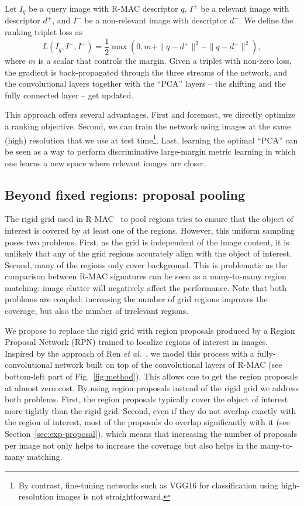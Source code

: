 \documentclass[runningheads]{llncs}
\def\etal{\emph{et al.}~}
\begin{document}
Let $I_q$ be a query image with R-MAC descriptor $q$, $I^+$ be a relevant image with descriptor $d^+$, and $I^-$ be a
non-relevant image with descriptor $d^-$.
We define the ranking triplet loss as
\begin{equation}
L(I_q,I^+,I^-) = \frac{1}{2} \max (0, m + \|q-d^+\|^2 - \|q-d^-\|^2),
\end{equation}
where $m$ is a scalar that controls the margin. 
Given a triplet with non-zero loss, the gradient is back-propagated through the three streams of the
network, and the convolutional layers together with the ``PCA'' layers -- the shifting and the fully connected layer -- get updated.

This approach offers several advantages. First and foremost, we directly optimize a ranking objective. Second, we can
train the network using images at the same (high) resolution that we use at test time\footnote{By contrast, fine-tuning
networks such as VGG16 for classification using high-resolution images is not straightforward.}. Last, learning the
optimal ``PCA'' can be seen as a way to perform discriminative large-margin metric learning \cite{Weinberger:2009} in
which one learns a new space where relevant images are closer.

\subsection{Beyond fixed regions: proposal pooling}
\label{sec:proposal}
The rigid grid used in R-MAC~\cite{Tolias2016} to pool regions tries to ensure that the object of interest is covered by at least one of the regions.
However, this uniform sampling poses two problems. First, as the grid is independent of the image content, it is
unlikely that any of the grid regions accurately align with the object of interest.
Second, many of the regions only cover background. This is problematic as the comparison between R-MAC signatures can be seen as a many-to-many region matching: image clutter will negatively affect the performance. Note that both problems are coupled: increasing the number of grid regions improves the coverage, but also the number of irrelevant regions.

We propose to replace the rigid grid with region proposals produced by a Region Proposal Network (RPN) 
trained to localize regions of interest in images. 
Inspired by the approach of Ren \etal\cite{Ren2015faster}, we model this process with a 
fully-convolutional network built on top of the convolutional layers of R-MAC (see bottom-left part of Fig.~\ref{fig:method}). 
This allows one to get the region proposals at almost zero cost.
By using region proposals instead of the rigid grid we address both problems.
First, the region proposals typically cover the object of interest more tightly than the rigid grid.
Second, even if they do not overlap exactly with the region of interest, most of the proposals do overlap significantly with it (see Section~\ref{sec:exp-proposal}), which means that increasing the number of proposals per image not only helps to increase the coverage but also helps in the many-to-many matching.
\end{document}

